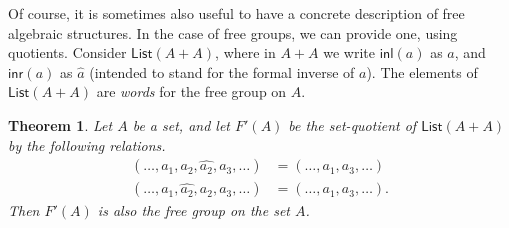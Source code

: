 \documentclass[10pt,a4paper]{article}
\newcommand{\inlsym}{{\mathsf{inl}}}
\newcommand{\inrsym}{{\mathsf{inr}}}
\newcommand{\inl}{\ensuremath\inlsym\xspace}
\newcommand{\inr}{\ensuremath\inrsym\xspace}
\newcommand{\freegroupx}[1]{F'(#1)} %
\newcommand{\lst}[1]{\mathsf{List}(#1)}
\newtheorem{thm}{Theorem}[section]
\theoremstyle{definition}
\theoremstyle{remark}
\numberwithin{equation}{section}
\begin{document}
Of course, it is sometimes also useful to have a concrete description of free algebraic structures.
In the case of free groups, we can provide one, using quotients.
Consider $\lst{A+A}$, where in $A+A$ we write $\inl(a)$ as $a$, and $\inr(a)$ as $\hat{a}$ (intended to stand for the formal inverse of $a$).
The elements of $\lst{A+A}$ are \emph{words} for the free group on $A$.

\begin{thm}
  Let $A$ be a set, and let $\freegroupx{A}$ be the set-quotient of $\lst{A+A}$ by the following relations.
  \begin{align*}
    (\dots,a_1,a_2,\widehat{a_2},a_3,\dots) &=
    (\dots,a_1,a_3,\dots)\\
    (\dots,a_1,\widehat{a_2},a_2,a_3,\dots) &=
    (\dots,a_1,a_3,\dots).
  \end{align*}
  Then $\freegroupx{A}$ is also the free group on the set $A$.
\end{thm}
\end{document}
